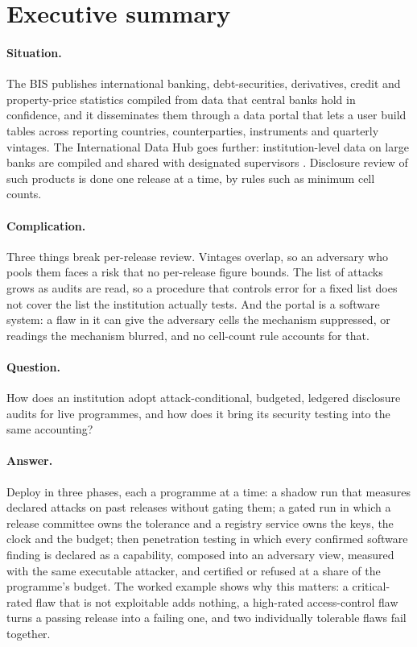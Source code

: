 \documentclass[11pt,a4paper]{article}
\begin{document}
\section*{Executive summary}
\paragraph{Situation.} The BIS publishes international banking, debt-securities, derivatives, credit and property-price statistics compiled from data that central banks hold in confidence, and it disseminates them through a data portal that lets a user build tables across reporting countries, counterparties, instruments and quarterly vintages. The International Data Hub goes further: institution-level data on large banks are compiled and shared with designated supervisors \citep{bisstats}. Disclosure review of such products is done one release at a time, by rules such as minimum cell counts.

\paragraph{Complication.} Three things break per-release review. Vintages overlap, so an adversary who pools them faces a risk that no per-release figure bounds. The list of attacks grows as audits are read, so a procedure that controls error for a fixed list does not cover the list the institution actually tests. And the portal is a software system: a flaw in it can give the adversary cells the mechanism suppressed, or readings the mechanism blurred, and no cell-count rule accounts for that.

\paragraph{Question.} How does an institution adopt attack-conditional, budgeted, ledgered disclosure audits for live programmes, and how does it bring its security testing into the same accounting?

\paragraph{Answer.} Deploy in three phases, each a programme at a time: a shadow run that measures declared attacks on past releases without gating them; a gated run in which a release committee owns the tolerance and a registry service owns the keys, the clock and the budget; then penetration testing in which every confirmed software finding is declared as a capability, composed into an adversary view, measured with the same executable attacker, and certified or refused at a share of the programme's budget. The worked example shows why this matters: a critical-rated flaw that is not exploitable adds nothing, a high-rated access-control flaw turns a passing release into a failing one, and two individually tolerable flaws fail together.
\end{document}
